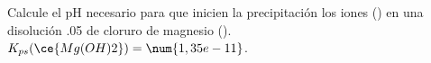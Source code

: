 Calcule el $\mathrm{pH}$ necesario para que inicien la precipitación los iones () en una disolución \SI{,05}{\Molar} de cloruro de magnesio (). $K_{ps}(\ce{Mg(OH)2})=\num{1,35e-11}$.
